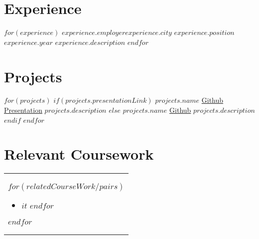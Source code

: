 \documentclass[$documentclass.fontsize$, $documentclass.papersize$]{$documentclass.class$}
\begin{document}
\vspace{-.5cm} %

\section*{Experience}
  \resumeSubHeadingListStart
    $for(experience)$
      \resumeSubheadingExperience
        {$experience.employer$}{$experience.city$}
        {$experience.position$}{$experience.year$}
        {$experience.description$}
    $endfor$
  \resumeSubHeadingListEnd

\vspace{-.5cm} %

\section*{Projects}
  \resumeSubHeadingListStart
      $for(projects)$
        $if(projects.presentationLink)$ %
        \makeProjectRowPres
          {$projects.name$}
            {\href{$projects.githubLink$}{Github}}
            {\href{$projects.presentationLink$}{Presentation}}
          {$projects.description$}
        $else$
        \makeProjectRowNoPres
          {$projects.name$}
            {\href{$projects.githubLink$}{Github}}
          {$projects.description$}
        $endif$
      $endfor$
  \resumeSubHeadingListEnd

\vspace{-.5cm} %

\section*{Relevant Coursework}
\begin{tabular}[t]{ @{}p{\textwidth} } %
  $for(relatedCourseWork/pairs)$
    \begin{minipage}[t]{.35\textwidth}
      \begin{itemize}[itemsep=-3pt,leftmargin=*]
        $for(it.value)$ %
          \item{$it$}
        $endfor$
      \end{itemize}
    \end{minipage}
  $endfor$
\end{tabular}
\end{document}
